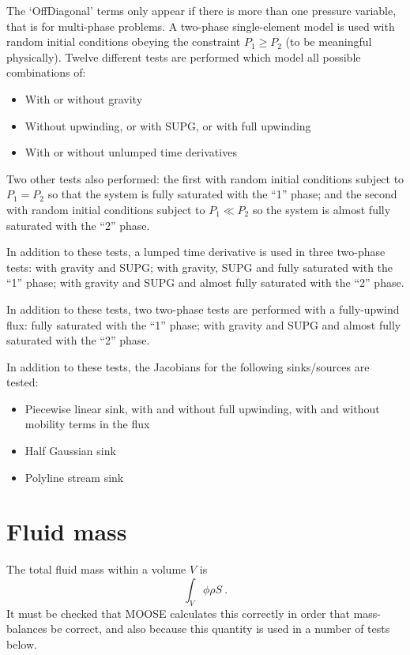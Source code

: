 \documentclass[]{scrreprt}
\begin{document}
The `OffDiagonal' terms only appear if there is more than one pressure
variable, that is for multi-phase problems.  A two-phase
single-element model is used with random initial conditions
obeying the constraint $P_{1}\geq P_{2}$ (to be meaningful physically).  Twelve
different tests are performed which model all possible combinations
of:
\begin{itemize}
\item With or without gravity
\item Without upwinding, or with SUPG, or with full upwinding
\item With or without unlumped time derivatives
\end{itemize}
Two other tests also performed: the first with random initial
conditions subject to $P_{1}=P_{2}$ so that the system is fully
saturated with the ``1'' phase; and the second with random initial
conditions subject to $P_{1}\ll P_{2}$ so the system is almost fully
saturated with the ``2'' phase.

In addition to these tests, a lumped time derivative is used in three
two-phase tests: with gravity and SUPG; with gravity, SUPG and fully
saturated with the ``1'' phase; with gravity and SUPG and almost fully
saturated with the ``2'' phase.

In addition to these tests, two two-phase tests are performed with a
fully-upwind flux: fully saturated with the ``1'' phase; with gravity
and SUPG and almost fully saturated with the ``2'' phase.

In addition to these tests, the Jacobians for the following sinks/sources are tested:
\begin{itemize}
\item Piecewise linear sink, with and without full upwinding, with and without mobility terms in the flux
\item Half Gaussian sink
\item Polyline stream sink
\end{itemize}



\chapter{Fluid mass}
\label{ma}

The total fluid mass within a volume $V$ is
\begin{equation}
\int_{V} \phi\rho S \ .
\end{equation}
It must be checked that MOOSE calculates this correctly in order that
mass-balances be correct, and also because this quantity is used in a
number of tests below.
\end{document}
